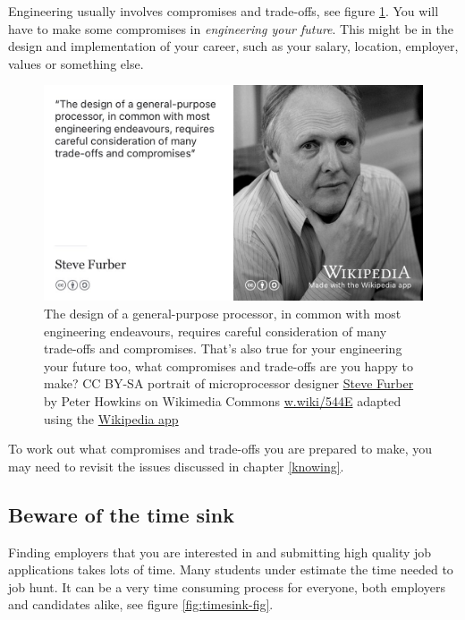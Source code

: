 \documentclass[
]{book}
\begin{document}
Engineering usually involves compromises and trade-offs, see figure \ref{fig:furber-fig}. You will have to make some compromises in \emph{engineering your future}. This might be in the design and implementation of your career, such as your salary, location, employer, values or something else.

\begin{figure}

{\centering \includegraphics[width=0.98\linewidth]{images/steve-furber} 

}

\caption{The design of a general-purpose processor, in common with most engineering endeavours, requires careful consideration of many trade-offs and compromises. \citep{furberarm} That's also true for your engineering your future too, what compromises and trade-offs are you happy to make? CC BY-SA portrait of microprocessor designer \href{https://en.wikipedia.org/wiki/Steve_Furber}{Steve Furber} by Peter Howkins on Wikimedia Commons \href{https://w.wiki/544E}{w.wiki/544E} adapted using the \href{https://apps.apple.com/gb/app/wikipedia/id324715238}{Wikipedia app}}\label{fig:furber-fig}
\end{figure}



To work out what compromises and trade-offs you are prepared to make, you may need to revisit the issues discussed in chapter \ref{knowing}. 🤔

\hypertarget{timesink}{%
\subsection{Beware of the time sink}\label{timesink}}

Finding employers that you are interested in and submitting high quality job applications takes lots of time. Many students under estimate the time needed to job hunt. It can be a very time consuming process for everyone, both employers and candidates alike, see figure \ref{fig:timesink-fig}.
\end{document}
